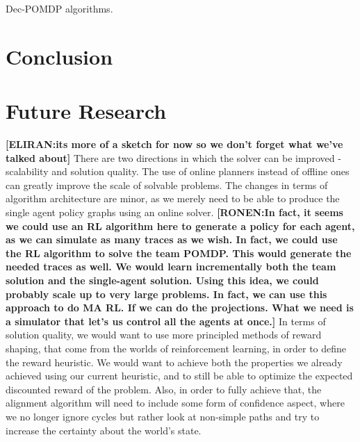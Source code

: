 \documentclass[letterpaper]{article} %
\newcommand{\eliran}[1]{\textbf{[\color{red}ELIRAN:#1]}}
\newcommand{\ronen}[1]{\textbf{[\color{blue}RONEN:#1]}}
\begin{document}
Dec-POMDP algorithms.

\section{Conclusion}

\section{Future Research}
\eliran{its more of a sketch for now so we don't forget what we've talked about}
There are two directions in which the solver can be improved -  scalability and solution quality.
The use of online planners instead of offline ones can greatly improve the scale of solvable problems. The changes in terms of algorithm architecture are minor, as we merely need to be able to produce the single agent policy graphs using an online solver. \ronen{In fact, it seems we could use an RL algorithm here to generate a policy for each agent, as we can simulate as many traces as we wish.
In fact, we could use the RL algorithm to solve the team POMDP. This would generate the needed traces as well. We would learn incrementally
both the team solution and the single-agent solution. Using this idea, we could probably scale up to very large problems. In fact, we can use this
approach to do MA RL. If we can do the projections. What we need is a simulator that let's us control all the agents at once.}
In terms of solution quality, we would want to use more principled methods of reward shaping, that come from the worlds of reinforcement learning, in order to define the reward heuristic. We would want to achieve both the properties we already achieved using our current heuristic, and to still be able to optimize the expected discounted reward of the problem.
Also, in order to fully achieve that, the alignment algorithm will need to include some form of confidence aspect, where we no longer ignore cycles but rather look at non-simple paths and try to increase the certainty about the world's state. 



\end{document}

